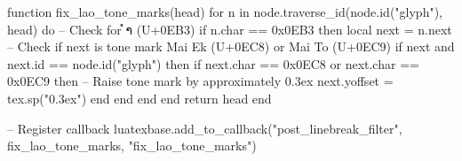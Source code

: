 \newcommand{\attrib}[1]{\hfill{#1}}
\newcommand{\verseindent}[1]{\hspace{2em}#1}
\newcommand{\verseindentii}[1]{\hspace{4em}#1}
\newcommand{\verseindentiii}[1]{\hspace{6em}#1}
\let\rs\rigidspace

\begin{luacode*}
function fix_lao_tone_marks(head)
    for n in node.traverse_id(node.id("glyph"), head) do
        -- Check for ຳ (U+0EB3)
        if n.char == 0x0EB3 then
            local next = n.next
            -- Check if next is tone mark Mai Ek (U+0EC8) or Mai To (U+0EC9)
            if next and next.id == node.id("glyph") then
                if next.char == 0x0EC8 or next.char == 0x0EC9 then
                    -- Raise tone mark by approximately 0.3ex
                    next.yoffset = tex.sp("0.3ex")
                end
            end
        end
    end
    return head
end

-- Register callback
luatexbase.add_to_callback("post_linebreak_filter", 
                          fix_lao_tone_marks, 
                          "fix_lao_tone_marks")
\end{luacode*}
